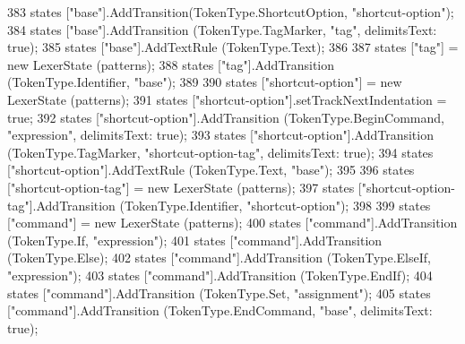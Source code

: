 \begin{DoxyCode}
383             states [\textcolor{stringliteral}{"base"}].AddTransition(TokenType.ShortcutOption, \textcolor{stringliteral}{"shortcut-option"});
384             states [\textcolor{stringliteral}{"base"}].AddTransition (TokenType.TagMarker, \textcolor{stringliteral}{"tag"}, delimitsText: \textcolor{keyword}{true});
385             states [\textcolor{stringliteral}{"base"}].AddTextRule (TokenType.Text);
386 
387             states [\textcolor{stringliteral}{"tag"}] = \textcolor{keyword}{new} LexerState (patterns);
388             states [\textcolor{stringliteral}{"tag"}].AddTransition (TokenType.Identifier, \textcolor{stringliteral}{"base"});
389 
390             states [\textcolor{stringliteral}{"shortcut-option"}] = \textcolor{keyword}{new} LexerState (patterns);
391             states [\textcolor{stringliteral}{"shortcut-option"}].setTrackNextIndentation = \textcolor{keyword}{true};
392             states [\textcolor{stringliteral}{"shortcut-option"}].AddTransition (TokenType.BeginCommand, \textcolor{stringliteral}{"expression"}, delimitsText: \textcolor{keyword}{
      true});
393             states [\textcolor{stringliteral}{"shortcut-option"}].AddTransition (TokenType.TagMarker, \textcolor{stringliteral}{"shortcut-option-tag"}, 
      delimitsText: \textcolor{keyword}{true});
394             states [\textcolor{stringliteral}{"shortcut-option"}].AddTextRule (TokenType.Text, \textcolor{stringliteral}{"base"});
395 
396             states [\textcolor{stringliteral}{"shortcut-option-tag"}] = \textcolor{keyword}{new} LexerState (patterns);
397             states [\textcolor{stringliteral}{"shortcut-option-tag"}].AddTransition (TokenType.Identifier, \textcolor{stringliteral}{"shortcut-option"});
398 
399             states [\textcolor{stringliteral}{"command"}] = \textcolor{keyword}{new} LexerState (patterns);
400             states [\textcolor{stringliteral}{"command"}].AddTransition (TokenType.If, \textcolor{stringliteral}{"expression"});
401             states [\textcolor{stringliteral}{"command"}].AddTransition (TokenType.Else);
402             states [\textcolor{stringliteral}{"command"}].AddTransition (TokenType.ElseIf, \textcolor{stringliteral}{"expression"});
403             states [\textcolor{stringliteral}{"command"}].AddTransition (TokenType.EndIf);
404             states [\textcolor{stringliteral}{"command"}].AddTransition (TokenType.Set, \textcolor{stringliteral}{"assignment"});
405             states [\textcolor{stringliteral}{"command"}].AddTransition (TokenType.EndCommand,  \textcolor{stringliteral}{"base"}, delimitsText: \textcolor{keyword}{true});

\end{DoxyCode}
